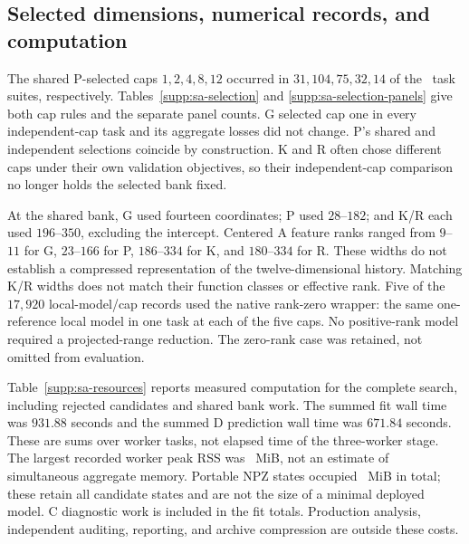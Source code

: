 \FloatBarrier
\subsection{Selected dimensions, numerical records, and computation}

The shared P-selected caps $1,2,4,8,12$ occurred in
$31,104,75,32,14$ of the \SATasks\ task suites, respectively.
Tables~\ref{supp:sa-selection} and \ref{supp:sa-selection-panels}
give both cap rules and the separate panel counts. G selected cap
one in every independent-cap task and its aggregate losses did not
change. P's shared and independent selections coincide by construction.
K and R often chose different caps under their own validation
objectives, so their independent-cap comparison no longer holds the
selected bank fixed.

At the shared bank, G used fourteen coordinates; P used $28$--$182$;
and K/R each used $196$--$350$, excluding the intercept. Centered
A feature ranks ranged from $9$--$11$ for G, $23$--$166$ for P,
$186$--$334$ for K, and $180$--$334$ for R. These widths do not
establish a compressed representation of the twelve-dimensional
history. Matching K/R widths does not match their function classes
or effective rank. Five of the $17{,}920$ local-model/cap records
used the native rank-zero wrapper: the same one-reference local
model in one task at each of the five caps. No positive-rank model
required a projected-range reduction. The zero-rank case was retained,
not omitted from evaluation.

Table~\ref{supp:sa-resources} reports measured computation for the
complete search, including rejected candidates and shared bank work.
The summed fit wall time was $931.88$ seconds and the summed D
prediction wall time was $671.84$ seconds. These are sums over worker
tasks, not elapsed time of the three-worker stage. The largest
recorded worker peak RSS was \SAPeakWorkerRSSMiB\ MiB, not an estimate
of simultaneous aggregate memory. Portable NPZ states occupied
\SAStateNPZMiB\ MiB in total; these retain all candidate states
and are not the size of a minimal deployed model. C diagnostic work
is included in the fit totals. Production analysis, independent
auditing, reporting, and archive compression are outside these costs.

